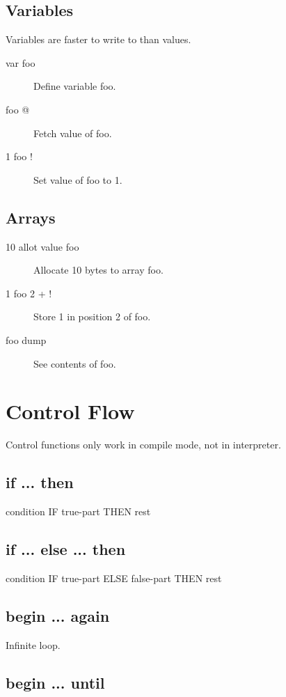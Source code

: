 \subsection{Variables}

Variables are faster to write to than values.

\begin{description}
\item[var foo] Define variable foo.
\item[foo @] Fetch value of foo.
\item[1 foo !] Set value of foo to 1.
\end{description}

\subsection{Arrays}

\begin{description}
\item[10 allot value foo] Allocate 10 bytes to array foo.
\item[1 foo 2 + !] Store 1 in position 2 of foo.
\item[foo dump] See contents of foo.
\end{description}


\section{Control Flow}

Control functions only work in compile mode, not in interpreter.

\subsection{if ... then}

condition IF true-part THEN rest

\subsection{if ... else ... then}

condition IF true-part ELSE false-part THEN rest

\subsection{begin ... again}

Infinite loop.

\subsection{begin ... until}

